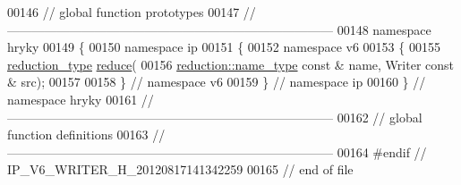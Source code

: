 \begin{DoxyCode}
00146 \textcolor{comment}{// global function prototypes}
00147 \textcolor{comment}{//
      ------------------------------------------------------------------------------}
00148 \textcolor{keyword}{namespace }hryky
00149 \{
00150 \textcolor{keyword}{namespace }ip
00151 \{
00152 \textcolor{keyword}{namespace }v6
00153 \{
00155     \hyperlink{namespacehryky_a343a9a4c36a586be5c2693156200eadc}{reduction_type} \hyperlink{namespacehryky_af41cb3af6766761da0ff21b84527a52c}{reduce}(
00156         \hyperlink{namespacehryky_1_1reduction_ac686c30a4c8d196bbd0f05629a6b921f}{reduction::name_type} \textcolor{keyword}{const} & name, Writer \textcolor{keyword}{const} & src);
00157 
00158 \} \textcolor{comment}{// namespace v6}
00159 \} \textcolor{comment}{// namespace ip}
00160 \} \textcolor{comment}{// namespace hryky}
00161 \textcolor{comment}{//
      ------------------------------------------------------------------------------}
00162 \textcolor{comment}{// global function definitions}
00163 \textcolor{comment}{//
      ------------------------------------------------------------------------------}
00164 \textcolor{preprocessor}{#endif // IP\_V6\_WRITER\_H\_20120817141342259}
00165 \textcolor{preprocessor}{}\textcolor{comment}{// end of file}
\end{DoxyCode}
